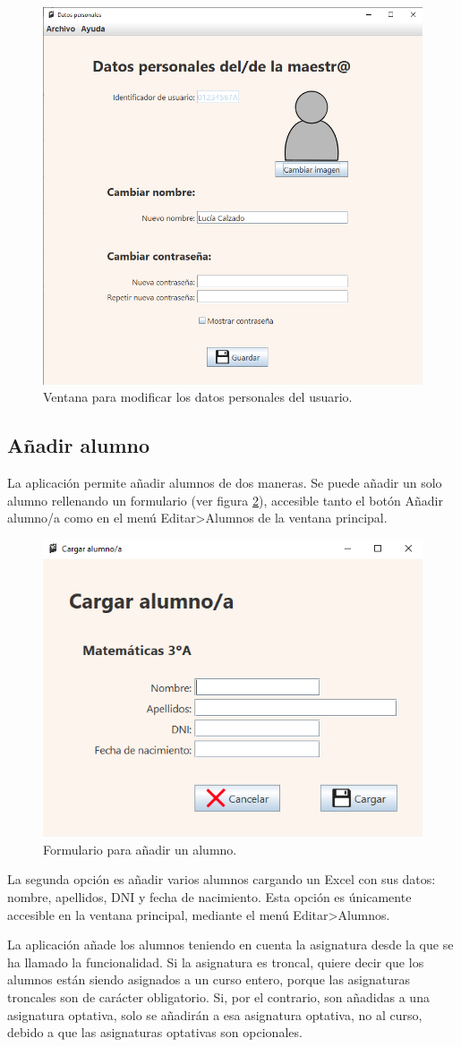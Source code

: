 \begin{figure}[h]
\centering\includegraphics[width=0.5\linewidth]{figs/datospersonales.png}
\caption{Ventana para modificar los datos personales del usuario.}
\label{Fig:datospersonales}
\end{figure}

\subsection{Añadir alumno}
La aplicación permite añadir alumnos de dos maneras. Se puede añadir un solo alumno rellenando un formulario (ver figura \ref{Fig:añadiralumno}), accesible tanto el botón Añadir alumno/a como en el menú Editar>Alumnos de la ventana principal.

\begin{figure}[h]
\centering\includegraphics[width=0.5\linewidth]{figs/cargaralumno.png}
\caption{Formulario para añadir un alumno.}
\label{Fig:añadiralumno}
\end{figure}

La segunda opción es añadir varios alumnos cargando un Excel con sus datos: nombre, apellidos, DNI y fecha de nacimiento. Esta opción es únicamente accesible en la ventana principal, mediante el menú Editar>Alumnos.

La aplicación añade los alumnos teniendo en cuenta la asignatura desde la que se ha llamado la funcionalidad. Si la asignatura es troncal, quiere decir que los alumnos están siendo asignados a un curso entero, porque las asignaturas troncales son de carácter obligatorio. Si, por el contrario, son añadidas a una asignatura optativa, solo se añadirán a esa asignatura optativa, no al curso, debido a que las asignaturas optativas son opcionales.

